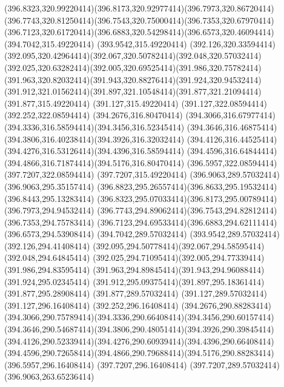 {{	\curveto(396.8323,320.99220414)(396.8173,320.92977414)(396.7973,320.86720414)
	\curveto(396.7743,320.81250414)(396.7543,320.75000414)(396.7353,320.67970414)
	\curveto(396.7123,320.61720414)(396.6883,320.54298414)(396.6573,320.46094414)
	\lineto(394.7042,315.49220414)
	\lineto(393.9542,315.49220414)
	\lineto(392.126,320.33594414)
	\curveto(392.095,320.42964414)(392.067,320.50782414)(392.048,320.57032414)
	\curveto(392.025,320.63282414)(392.005,320.69525414)(391.986,320.75782414)
	\curveto(391.963,320.82032414)(391.943,320.88276414)(391.924,320.94532414)
	\curveto(391.912,321.01562414)(391.897,321.10548414)(391.877,321.21094414)
	\lineto(391.877,315.49220414)
	\lineto(391.127,315.49220414)
	\lineto(391.127,322.08594414)
	\lineto(392.252,322.08594414)
	\lineto(394.2676,316.80470414)
	\curveto(394.3066,316.67977414)(394.3336,316.58594414)(394.3456,316.52345414)
	\curveto(394.3646,316.46875414)(394.3806,316.40238414)(394.3926,316.32032414)
	\curveto(394.4126,316.44525414)(394.4276,316.53126414)(394.4396,316.58594414)
	\curveto(394.4596,316.64844414)(394.4866,316.71874414)(394.5176,316.80470414)
	\lineto(396.5957,322.08594414)
	\lineto(397.7207,322.08594414)
	\lineto(397.7207,315.49220414)
	\closepath
	\moveto(396.9063,289.57032414)
	\lineto(396.9063,295.35157414)
	\curveto(396.8823,295.26557414)(396.8633,295.19532414)(396.8443,295.13283414)
	\curveto(396.8323,295.07033414)(396.8173,295.00789414)(396.7973,294.94532414)
	\curveto(396.7743,294.89062414)(396.7543,294.82812414)(396.7353,294.75783414)
	\curveto(396.7123,294.69533414)(396.6883,294.62111414)(396.6573,294.53908414)
	\lineto(394.7042,289.57032414)
	\lineto(393.9542,289.57032414)
	\lineto(392.126,294.41408414)
	\curveto(392.095,294.50778414)(392.067,294.58595414)(392.048,294.64845414)
	\curveto(392.025,294.71095414)(392.005,294.77339414)(391.986,294.83595414)
	\curveto(391.963,294.89845414)(391.943,294.96088414)(391.924,295.02345414)
	\curveto(391.912,295.09375414)(391.897,295.18361414)(391.877,295.28908414)
	\lineto(391.877,289.57032414)
	\lineto(391.127,289.57032414)
	\lineto(391.127,296.16408414)
	\lineto(392.252,296.16408414)
	\lineto(394.2676,290.88283414)
	\curveto(394.3066,290.75789414)(394.3336,290.66408414)(394.3456,290.60157414)
	\curveto(394.3646,290.54687414)(394.3806,290.48051414)(394.3926,290.39845414)
	\curveto(394.4126,290.52339414)(394.4276,290.60939414)(394.4396,290.66408414)
	\curveto(394.4596,290.72658414)(394.4866,290.79688414)(394.5176,290.88283414)
	\lineto(396.5957,296.16408414)
	\lineto(397.7207,296.16408414)
	\lineto(397.7207,289.57032414)
	\closepath
	\moveto(396.9063,263.65236414)
}}
